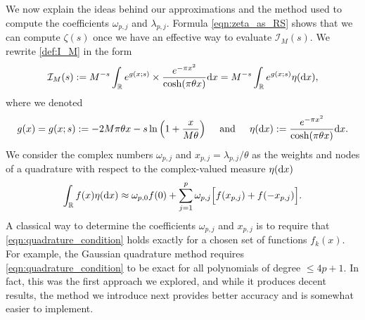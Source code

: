 \documentclass[12pt]{article}
\def\r{{\mathbb R}}
\def\d{{\textnormal d}}
\def\ii{{\mathcal I}}
\theoremstyle{definition}
\begin{document}
We now explain the ideas behind our approximations and the method used to compute the coefficients $\omega_{p,j}$ and $\lambda_{p,j}$. Formula \eqref{eqn:zeta_as_RS} shows that we can compute $\zeta(s)$ once we have an effective way to evaluate  $\ii_M(s)$.
We rewrite \eqref{def:I_M} in the form
\begin{equation}\label{def:I_M2}
{\mathcal I}_M(s):= M^{-s} \int_{\r}  e^{g(x;s)} \times \frac{e^{-\pi x^2}}{\cosh(\pi \theta x)}  
 \d x=M^{-s} \int_{\r} e^{g(x;s)} \eta(\d x),
 \end{equation}  
where we denoted
$$
g(x)=g(x;s):=-2 M \pi \theta x - s \ln\Big( 1  + \frac{x}{M\theta} \Big) \;\;\;\; {\textnormal{ and }} \;\;\;\; 
\eta(\d x):=\frac{e^{-\pi x^2}}{\cosh(\pi \theta x)}  \d x.
$$
We consider the complex numbers $\omega_{p,j}$ and $x_{p,j}=\lambda_{p,j}/\theta$  as the weights and nodes of a quadrature
with respect to the complex-valued measure $\eta(\d x)$
\begin{equation}\label{eqn:quadrature_condition}
\int_{\r} f(x)  \eta(\d x) \approx 
\omega_{p,0} f(0)+  \sum\limits_{j=1}^p  \omega_{p,j} \Big[f(x_{p,j}) +
f(-x_{p,j})\Big].  
\end{equation}
A classical way to determine  the coefficients $\omega_{p,j}$ and $x_{p,j}$ is to require that \eqref{eqn:quadrature_condition} holds exactly for a chosen set of functions $f_k(x)$. 
For example, the Gaussian quadrature method requires \eqref{eqn:quadrature_condition} to be exact for all polynomials of degree $\le 4p+1$. In fact, this was the first approach we explored, and while it produces decent results, the method we introduce next provides better accuracy and is somewhat easier to implement. 
\end{document}
